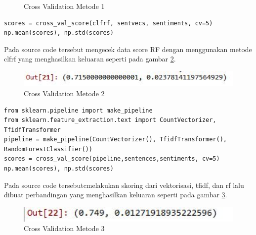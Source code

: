 \begin{enumerate}
\begin{figure}[!htbp]
	\caption{Cross Validation Metode 1}
	\label{c5_28}
\end{figure}
\begin{verbatim}
scores = cross_val_score(clfrf, sentvecs, sentiments, cv=5)
np.mean(scores), np.std(scores)
\end{verbatim}
\subitem Pada source code tersebut mengecek data score RF dengan menggunakan metode clfrf yang menghasilkan keluaran seperti pada gambar \ref{c5_29}.
\begin{figure}[!htbp]
	\centerline{\includegraphics[width=1\textwidth]{figures/huda/chapter5/29.JPG}}
	\caption{Cross Validation Metode 2}
	\label{c5_29}
\end{figure}
\begin{verbatim}
from sklearn.pipeline import make_pipeline
from sklearn.feature_extraction.text import CountVectorizer, TfidfTransformer
pipeline = make_pipeline(CountVectorizer(), TfidfTransformer(), RandomForestClassifier())
scores = cross_val_score(pipeline,sentences,sentiments, cv=5)
np.mean(scores), np.std(scores)
\end{verbatim}
\subitem Pada source code tersebutcmelakukan skoring dari vektorisasi, tfidf, dan rf lalu dibuat perbandingan yang menghasilkan keluaran seperti pada gambar \ref{c5_30}.
\begin{figure}[!htbp]
	\centerline{\includegraphics[width=1\textwidth]{figures/huda/chapter5/30.JPG}}
	\caption{Cross Validation Metode 3}
	\label{c5_30}
\end{figure}
\end{enumerate}